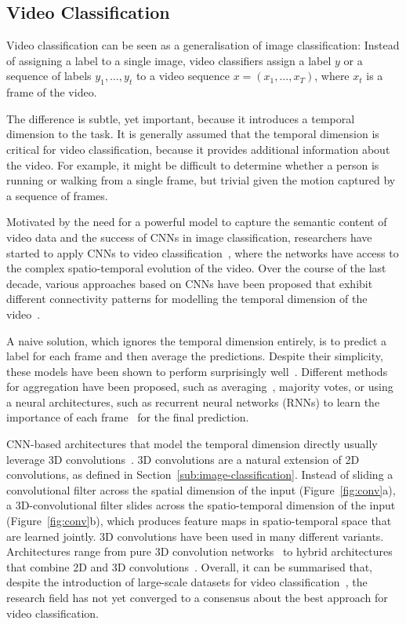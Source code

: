\documentclass[a4paper]{article}
\begin{document}
\subsection{Video Classification}
\label{sub:video-classification}

Video classification can be seen as a generalisation of image classification:
Instead of assigning a label to a single image, video classifiers assign a label
$y$ or a sequence of labels $y_1, \ldots, y_t$ to a video sequence $x = (x_1,
\ldots, x_T)$, where $x_t$ is a frame of the video.

The difference is subtle, yet important, because it introduces a temporal
dimension to the task. It is generally assumed that the temporal dimension
is critical for video classification, because it provides additional
information about the video. For example, it might be difficult to determine
whether a person is running or walking from a single frame, but trivial given
the motion captured by a sequence of frames.

Motivated by the need for a powerful model to capture the semantic content of
video data and the success of CNNs in image classification, researchers have
started to apply CNNs to video classification~\cite{videocnn, i3d, c3d, x3d,
slowfast}, where the networks have access to the complex spatio-temporal
evolution of the video. Over the course of the last decade, various approaches
based on CNNs have been proposed that exhibit different connectivity patterns
for modelling the temporal dimension of the video~\cite{videocnn}.

A naive solution, which ignores the temporal dimension entirely, is to predict a
label for each frame and then average the predictions. Despite their simplicity,
these models have been shown to perform surprisingly well~\cite{videocnn}.
Different methods for aggregation have been proposed, such as
averaging~\cite{videocnn}, majority votes, or using a neural architectures, such
as recurrent neural networks (RNNs) to learn the importance of each
frame~\cite{lrcn} for the final prediction.

CNN-based architectures that model the temporal dimension directly usually
leverage 3D convolutions~\cite{c3d, i3d}. 3D convolutions are a natural
extension of 2D convolutions, as defined in
Section~\ref{sub:image-classification}. Instead of sliding a convolutional
filter across the spatial dimension of the input (Figure~\ref{fig:conv}a), a
3D-convolutional filter slides across the spatio-temporal dimension of the input
(Figure~\ref{fig:conv}b), which produces feature maps in spatio-temporal space
that are learned jointly. 3D convolutions have been used in many different
variants. Architectures range from pure 3D convolution networks~\cite{i3d, c3d}
to hybrid architectures that combine 2D and 3D convolutions~\cite{x3d,
slowfast}. Overall, it can be summarised that, despite the introduction of
large-scale datasets for video classification~\cite{kinetics}, the research
field has not yet converged to a consensus about the best approach for video
classification.
\end{document}
